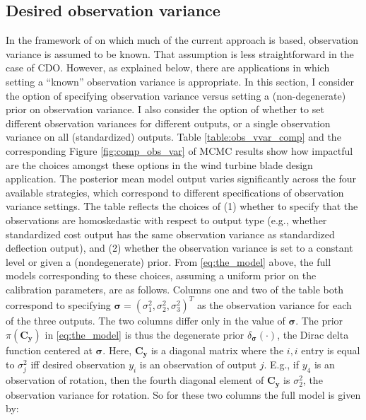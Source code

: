 \documentclass{article}
\begin{document}
\subsection{Desired observation variance}\label{des_obs_var}
In the framework of \cite{Kennedy2006} on which much of the current approach is based, observation variance is assumed to be known. 
That assumption is less straightforward in the case of CDO. 
However, as explained below, there are applications in which setting a ``known'' observation variance is appropriate. 
In this section, I consider the option of specifying observation variance versus setting a (non-degenerate) prior on observation variance. 
I also consider the option of whether to set different observation variances for different outputs, or a single observation variance on all (standardized) outputs. 
Table \ref{table:obs_vvar_comp} and the corresponding Figure \ref{fig:comp_obs_var} of MCMC results show how impactful are the choices amongst these options in the wind turbine blade design application. 
The posterior mean model output varies significantly across the four available strategies, which correspond to different specifications of observation variance settings. 
The table reflects the choices of (1) whether to specify that the observations are homoskedastic with respect to output type (e.g., whether standardized cost output has the same observation variance as standardized deflection output), and (2) whether the observation variance is set to a constant level or given a (nondegenerate) prior.
From \eqref{eq:the_model} above, the full models corresponding to these choices, assuming a uniform prior on the calibration parameters, are as follows. 
Columns one and two of the table both correspond to specifying $\boldsymbol \sigma = (\sigma^2_1,\sigma^2_2,\sigma^2_3)^T$ as the observation variance for each of the three outputs. 
The two columns differ only in the value of $\boldsymbol \sigma$. 
The prior $\pi(\mathbf C_{\mathbf y})$ in \eqref{eq:the_model} is thus the degenerate prior $\delta_{\boldsymbol\sigma}(\cdot)$, the Dirac delta function centered at $\boldsymbol \sigma$. 
Here, $\mathbf C_{\mathbf y}$ is a diagonal matrix where the $i,i$ entry is equal to $\sigma^2_j$ iff desired observation $y_i$ is an observation of output $j$. 
E.g., if $y_4$ is an observation of rotation, then the fourth diagonal element of $\mathbf C_{\mathbf y}$ is $\sigma^2_2$, the observation variance for rotation. 
So for these two columns the full model is given by:
\end{document}
